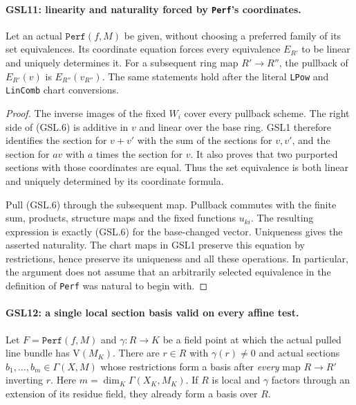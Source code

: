 \documentclass[11pt,a4paper]{article}
\numberwithin{equation}{section}
\theoremstyle{remark}\newtheorem{remark}[theorem]{Remark}
\begin{document}
\paragraph{GSL11: linearity and naturality forced by \texttt{Perf}'s coordinates.}
\label{claim:GSL11}
Let an actual $\texttt{Perf}(f,M)$ be given, without choosing a
preferred family of its set equivalences.  Its coordinate equation
forces every equivalence $E_{R'}$ to be linear and uniquely determines
it.  For a subsequent ring map $R'\to R''$, the pullback of
$E_{R'}(v)$ is $E_{R''}(v_{R''})$.  The same statements hold after
the literal \texttt{LPow} and \texttt{Lin\allowbreak Comb} chart conversions.

\begin{proof}
The inverse images of the fixed $W_i$ cover every pullback scheme.
The right side of (GSL.6) is additive in $v$ and linear over the
base ring.  GSL1 therefore identifies the section for $v+v'$ with
the sum of the sections for $v,v'$, and the section for $av$ with
$a$ times the section for $v$.  It also proves that two purported
sections with those coordinates are equal.  Thus the set equivalence
is both linear and uniquely determined by its coordinate formula.

Pull (GSL.6) through the subsequent map.  Pullback commutes with the
finite sum, products, structure maps and the fixed functions $u_{ki}$.
The resulting expression is exactly (GSL.6) for the base-changed
vector.  Uniqueness gives the asserted naturality.  The chart maps
in GSL1 preserve this equation by restrictions, hence preserve its
uniqueness and all these operations.  In particular, the argument
does not assume that an arbitrarily selected equivalence in the
definition of \texttt{Perf} was natural to begin with.
\end{proof}

\paragraph{GSL12: a single local section basis valid on every affine test.}
\label{claim:GSL12}
Let $F=\texttt{Perf}(f,M)$ and $\gamma:R\to K$ be a field point
at which the actual pulled line bundle has $\mathrm V(M_K)$.
There are $r\in R$ with $\gamma(r)\ne0$ and actual sections
$b_1,\ldots,b_m\in\Gamma(X,M)$ whose restrictions form a basis
after \emph{every} map $R\to R'$ inverting $r$.  Here
$m=\dim_K\Gamma(X_K,M_K)$.  If $R$ is local and $\gamma$ factors
through an extension of its residue field, they already form a basis
over $R$.
\end{document}

